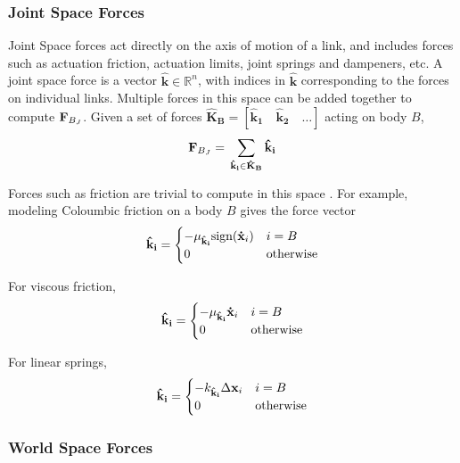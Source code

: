 \subsubsection{Joint Space Forces}
Joint Space forces act directly on the axis of motion of a link, and includes forces such as actuation friction, actuation limits, joint springs and dampeners, etc. A joint space force is a vector $\hat{\mathbf{k}} \in \mathbb{R}^n$, with indices in $\hat{\mathbf{k}}$ corresponding to the forces on individual links. Multiple forces in this space can be added together to compute ${\mathbf{F}}_{B_J}$. Given a set of forces $\mathbf{\hat{K}_B} = \left [ \mathbf{\hat{k}_1} \quad \mathbf{\hat{k}_2} \quad \hdots \right ]$ acting on body $B$, 
\begin{align}
	{\mathbf{F}}_{B_J} = \Big.\sum_{\mathbf{\hat{k}_i} \in \mathbf{\hat{K}_B}}\mathbf{\hat{k}_i}
\end{align}

\noindent Forces such as friction are trivial to compute in this space \cite{lynch_park_2019}. For example, modeling Coloumbic friction on a body $B$ gives the force vector 
\begin{align} \label{eqn:coulomb}
    \mathbf{\hat{k}_i} = 
    \begin{cases}
         - \mu_{\mathbf{\hat{k}_i}}\text{sign}({\mathbf{\dot{x}}}_i) & i = B \\
         0 & \text{otherwise}
    \end{cases}
\end{align}

\noindent For viscous friction,
\begin{align} \label{eqn:viscous}
    \mathbf{\hat{k}_i} = 
    \begin{cases}
         - \mu_{\mathbf{\hat{k}_i}}{\mathbf{\dot{x}}}_i & i = B \\
         0 & \text{otherwise}
    \end{cases}
\end{align}

\noindent For linear springs,
\begin{align} \label{eqn:spring}
    \mathbf{\hat{k}_i} = 
    \begin{cases}
         - k_{\mathbf{\hat{k}_i}}\Delta {\mathbf{{x}}}_i & i = B \\
         0 & \text{otherwise}
    \end{cases}
\end{align}

\subsubsection{World Space Forces}

